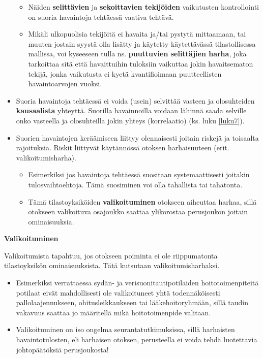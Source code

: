 \documentclass[
]{book}
\providecommand{\tightlist}{%
  \setlength{\itemsep}{0pt}\setlength{\parskip}{0pt}}
\begin{document}
\begin{itemize}
  \begin{itemize}
  \tightlist
  \item
    Näiden \textbf{selittävien} ja \textbf{sekoittavien tekijöiden} vaikutusten kontrollointi on suoria havaintoja tehtäessä vaativa tehtävä.
  \item
    Mikäli ulkopuolisia tekijöitä ei havaita ja/tai pystytä mittaamaan, tai muuten jostain syystä olla lisätty ja käytetty käytettävässä tilastollisessa mallissa, voi kyseeseen tulla ns. \textbf{puuttuvien selittäjien harha}, joka tarkoittaa sitä että havaittuihin tuloksiin vaikuttaa jokin havaitsematon tekijä, jonka vaikutusta ei kyetä kvantifioimaan puutteellisten havaintoarvojen vuoksi.
  \end{itemize}
\item
  Suoria havaintoja tehtäessä ei voida (usein) selvittää vasteen ja olosuhteiden \textbf{kausaalista} yhteyttä. Suorilla havainnoilla voidaan lähinnä saada selville onko vasteella ja olosuhteilla jokin yhteys (korrelaatio) (ks. luku \ref{luku7}).
\item
  Suorien havaintojen keräämiseen liittyy olennaisesti joitain riskejä ja toisaalta rajoituksia. Riskit liittyvät käytännössä otoksen harhaisuuteen (erit. valikoitumisharha).

  \begin{itemize}
  \tightlist
  \item
    Esimerkiksi jos havaintoja tehtäessä suositaan systemaattisesti joitakin tulosvaihtoehtoja. Tämä suosiminen voi olla tahallista tai tahatonta.
  \item
    Tämä tilastoyksiköiden \textbf{valikoituminen} otokseen aiheuttaa harhaa, sillä otokseen valikoituva osajoukko saattaa ylikorostaa perusjoukon joitain ominaisuuksia.
  \end{itemize}
\end{itemize}

\begin{defblock}{}

\textbf{Valikoituminen}

Valikoitumista tapahtuu, jos otokseen poiminta ei ole riippumatonta tilastoyksikön ominaisuuksista. Tätä kutsutaan valikoitumisharhaksi.

\begin{itemize}
\item
  Esimerkiksi verrattaessa sydän- ja verisuonitautipotilaiden hoitotoimenpiteitä potilaat eivät mahdollisesti ole valikoituneet yhtä todennäköisesti pallolaajennukseen, ohitusleikkaukseen tai lääkehoitoryhmään, sillä taudin vakavuus saattaa jo määritellä mikä hoitotoimenpide valitaan.
\item
  Valikoituminen on iso ongelma seurantatutkimuksissa, sillä harhaisten havaintotulosten, eli harhaisen otoksen, perusteella ei voida tehdä luotettavia johtopäätöksiä perusjoukosta!
\end{itemize}

\end{defblock}
\end{document}
